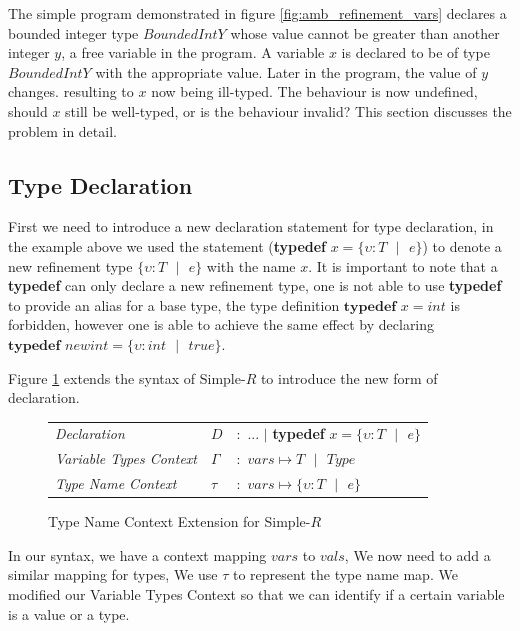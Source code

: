 \documentclass[a4paper,12pt]{report}
\begin{document}
\par
The simple program demonstrated in figure \ref{fig:amb_refinement_vars} declares a 
bounded integer type $BoundedIntY$ whose value cannot be greater than another integer $y$, 
a free variable in the program. A variable $x$ is declared to be of type 
$BoundedIntY$ with the appropriate value. Later in the program, the value of $y$ 
changes. resulting to $x$ now being ill-typed. The behaviour is now undefined, 
should $x$ still be well-typed, or is the behaviour invalid? This section 
discusses the problem in detail. 

\subsection{Type Declaration}
First we need to introduce a new declaration statement for type declaration, 
in the example above we used the statement 
(\textbf{typedef} $x = \{\upsilon : T\text{ }|\text{ }e\}$) to denote a 
new refinement type $\{\upsilon : T\text{ }|\text{ }e\}$ with the name $x$. It is 
important to note that a \textbf{typedef} can only declare a new refinement type, one is 
not able to use \textbf{typedef} to provide an alias for a base type, the type 
definition $\textbf{typedef } x = int$ is forbidden, however one is able to achieve the 
same effect by declaring $\textbf{typedef }newint = \{\upsilon : int\text{ }|\text{ }true\}$.

\par
Figure \ref{fig:typedef-extend} extends the syntax of Simple-$R$ to introduce 
the new form of declaration.
\begin{figure}[H]
  \begin{center}
    \begin{tabular} {l l l}
      \textit{Declaration} & $D$ & $:$ ... $|$ \textbf{typedef }$x = \{\upsilon : T\text{ }|\text{ }e\}$\\
      \textit{Variable Types Context} & $\Gamma$& $:$ $vars \mapsto T\text{ }|\text{ }Type$\\
      \textit{Type Name Context} & $\tau$& $:$ $vars \mapsto \{\upsilon : T\text{ }|\text{ }e\}$ \\
    \end{tabular}
  \end{center}
  \caption{Type Name Context Extension for Simple-$R$}
  \label{fig:typedef-extend}
\end{figure}

\par
In our syntax, we have a context mapping $vars$ to $vals$, We now need to 
add a similar mapping for types, We use $\tau$ to represent the type name map. 
We modified our Variable Types Context so that we can identify if a certain 
variable is a value or a type. 
\end{document}
